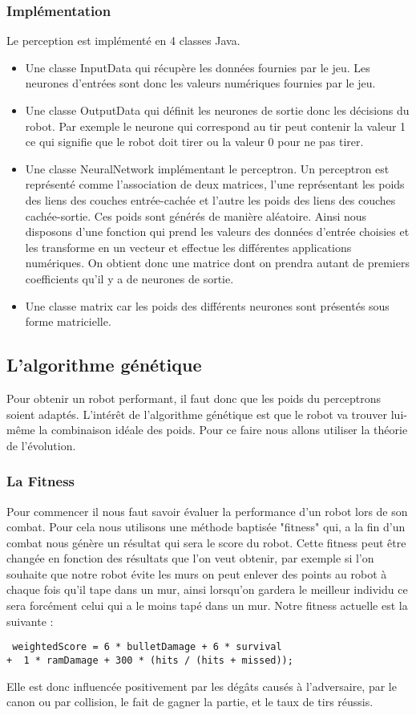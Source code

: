 \documentclass[12pt]{article}
\begin{document}
\subsubsection{Implémentation}
Le perception est implémenté en 4 classes Java.
\begin{itemize}
\item Une classe InputData qui récupère les données fournies par le jeu. Les neurones d'entrées sont donc les valeurs numériques fournies par le jeu.
\item Une classe OutputData qui définit les neurones de sortie donc les décisions du robot. Par exemple le neurone qui correspond au tir peut contenir la valeur 1 ce qui signifie que le robot doit tirer ou la valeur 0 pour ne pas tirer.
\item Une classe NeuralNetwork implémentant le perceptron. Un perceptron est représenté comme l'association de deux matrices, l'une représentant les poids des liens des couches
entrée-cachée et l'autre les poids des liens des couches cachée-sortie. Ces poids sont générés de manière aléatoire.
Ainsi nous disposons d'une fonction qui prend les valeurs des données d'entrée
choisies et les transforme en un vecteur et effectue les différentes applications
numériques. On obtient donc une matrice dont on prendra autant de premiers coefficients qu'il y a de neurones de sortie.
\item Une classe matrix car les poids des différents neurones sont présentés sous forme matricielle.
\end{itemize}

\subsection{L'algorithme génétique}
Pour obtenir un robot performant, il faut donc que les poids du perceptrons soient adaptés. L'intérêt de l'algorithme génétique est que le robot va trouver lui-même la combinaison idéale des poids. Pour ce faire nous allons utiliser la théorie de l'évolution.

\subsubsection{La Fitness}
Pour commencer il nous faut savoir évaluer la performance d'un robot lors de son combat. Pour cela nous utilisons une méthode baptisée "fitness" qui, a la fin d'un combat nous génère un résultat qui sera le score du robot. Cette fitness peut être changée en fonction des résultats que l'on veut obtenir, par exemple si l'on souhaite que notre robot évite les murs on peut enlever des points au robot à chaque fois qu'il tape dans un mur, ainsi lorsqu'on gardera le meilleur individu ce sera forcément celui qui a le moins tapé dans un mur.
Notre fitness actuelle est la suivante :
\begin{lstlisting}
 weightedScore = 6 * bulletDamage + 6 * survival  
+  1 * ramDamage + 300 * (hits / (hits + missed));
 \end{lstlisting}
 Elle est donc influencée positivement par les dégâts causés à l'adversaire, par le canon ou par collision, le fait de gagner la partie, et le taux de tirs réussis. 
\end{document}
